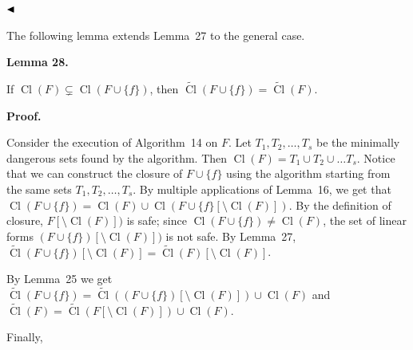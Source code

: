 \documentclass[10pt,a4paper]{article}
\begin{document}
$\hfill\blacktriangleleft$\par



The following lemma extends Lemma 27 to the general case.\par



\par\medskip\noindent\textbf{
Lemma 28.
}\par



If $\mathop{\mathrm{Cl}}(F)\subsetneq\mathop{\mathrm{Cl}}(F\cup\{f\})$, then $\widetilde{\mathop{\mathrm{Cl}}}(F\cup\{f\})=\widetilde{\mathop{\mathrm{Cl}}}(F)$.\par



\par\medskip\noindent\textbf{Proof.}\par


Consider the execution of Algorithm 14 on $F$.
Let $T_{1},T_{2},\dots,T_{s}$ be the minimally dangerous sets found by the algorithm. Then $\mathop{\mathrm{Cl}}(F)=T_{1}\cup T_{2}\cup\dots T_{s}$.
Notice that we can construct the closure of $F\cup\{f\}$ using the algorithm starting from the same sets $T_{1},T_{2},\dots,T_{s}$.
By multiple applications of Lemma 16, we get that $\mathop{\mathrm{Cl}}(F\cup\{f\})=\mathop{\mathrm{Cl}}(F)\cup\mathop{\mathrm{Cl}}(F\cup\{f\}[\setminus\mathop{\mathrm{Cl}}(F)])$.
By the definition of closure, $F[\setminus\mathop{\mathrm{Cl}}(F)])$ is safe;
since $\mathop{\mathrm{Cl}}(F\cup\{f\})\neq\mathop{\mathrm{Cl}}(F)$, the set of linear forms $(F\cup\{f\})[\setminus\mathop{\mathrm{Cl}}(F)])$ is not safe.
By Lemma 27, $\widetilde{\mathop{\mathrm{Cl}}}(F\cup\{f\})[\setminus\mathop{\mathrm{Cl}}(F)]=\widetilde{\mathop{\mathrm{Cl}}}(F)[\setminus\mathop{\mathrm{Cl}}(F)]$.\par



By Lemma 25
we get $\widetilde{\mathop{\mathrm{Cl}}}(F\cup\{f\})=\widetilde{\mathop{\mathrm{Cl}}}((F\cup\{f\})[\setminus\mathop{\mathrm{Cl}}(F)])\cup\mathop{\mathrm{Cl}}(F)$ and $\widetilde{\mathop{\mathrm{Cl}}}(F)=\widetilde{\mathop{\mathrm{Cl}}}(F[\setminus\mathop{\mathrm{Cl}}(F)])\cup\mathop{\mathrm{Cl}}(F)$.\par



Finally,\par
\end{document}
